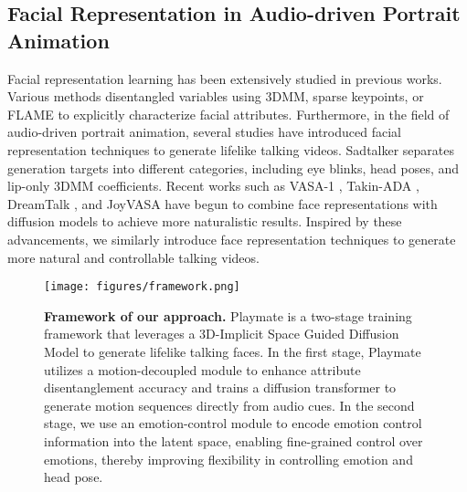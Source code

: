 \subsection{Facial Representation in Audio-driven Portrait Animation}
Facial representation learning has been extensively studied in previous works. Various methods \cite{siarohin2019first,ren2021pirenderer,li2017learning} disentangled variables using 3DMM, sparse keypoints, or FLAME to explicitly characterize facial attributes. Furthermore, in the field of audio-driven portrait animation, several studies have introduced facial representation techniques to generate lifelike talking videos. Sadtalker \cite{zhang2023sadtalker} separates generation targets into different categories, including eye blinks, head poses, and lip-only 3DMM coefficients. Recent works such as VASA-1 \cite{xu2024vasa}, Takin-ADA \cite{lin2024takin}, DreamTalk \cite{ma2023dreamtalk}, and JoyVASA \cite{cao2024joyvasa} have begun to combine face representations with diffusion models to achieve more naturalistic results. Inspired by these advancements, we similarly introduce face representation techniques to generate more natural and controllable talking videos. 
\setcounter{figure}{1}
\begin{figure*}[!t]
    \centering
    \texttt{[image: figures/framework.png]}
    \caption{\textbf{Framework of our approach.} Playmate is a two-stage training framework that leverages a 3D-Implicit Space Guided Diffusion Model to generate lifelike talking faces. In the first stage, Playmate utilizes a motion-decoupled module to enhance attribute disentanglement accuracy and trains a diffusion transformer to generate motion sequences directly from audio cues. In the second stage, we use an emotion-control module to encode emotion control information into the latent space, enabling fine-grained control over emotions, thereby improving flexibility in controlling emotion and head pose.}
    \label{fig:framework}
    \vskip -0.1in
\end{figure*}